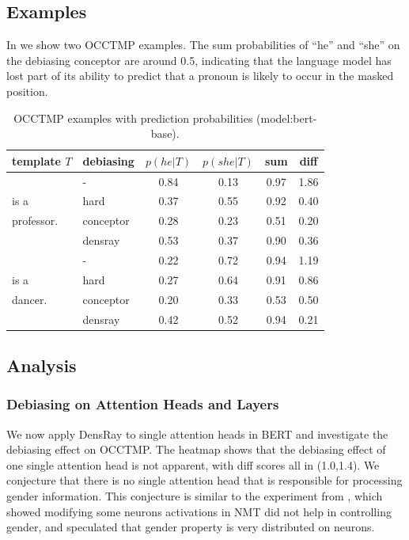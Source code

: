\subsection{Examples}
In  we show two OCCTMP examples.
The sum probabilities of ``he'' and ``she''
on the debiasing conceptor are around 0.5, indicating that
the language model has lost part of its ability to predict that 
a pronoun is  likely to occur in the masked position.
\begin{table}[h]
	\centering
	\footnotesize
	\vspace{-5pt}  
	\setlength{\abovecaptionskip}{0.2cm}   
	\setlength{\belowcaptionskip}{0cm}  
	\begin{tabular}{llcccc}
		\toprule
		template $T$ & debiasing & $p(he|T)$ & $p(she|T)$ &sum&diff\\
		\midrule
		 & - & 0.84 & 0.13&0.97&1.86\\
		\text{[MASK]} is a& hard& 0.37 & 0.55&0.92&0.40\\
	    professor.	& conceptor& 0.28 & 0.23&0.51&{0.20}\\
		& densray & 0.53 & 0.37&0.90&0.36\\
		\midrule
		 & - & 0.22 & 0.72&0.94&1.19\\
		\text{[MASK]} is a& hard& 0.27 & 0.64&0.91&0.86\\
		dancer.  & conceptor& 0.20 & 0.33&0.53&0.50\\
		& densray& 0.42 & 0.52&0.94&0.21\\
		\bottomrule
	\end{tabular}
	\caption{
		OCCTMP examples with prediction probabilities (model:bert-base).}
\end{table}

\subsection{Analysis}

\subsubsection*{Debiasing on Attention Heads and Layers}
We now apply DensRay to single attention heads in BERT and investigate the debiasing effect on OCCTMP. The heatmap  shows that the debiasing effect of one single attention head is not apparent, with diff scores all in (1.0,1.4). We conjecture that there is no single attention head that is responsible for processing gender information.
This conjecture is similar to the experiment from , which showed modifying some neurons activations in NMT did not help in controlling gender, and speculated that gender property is very distributed on neurons.

